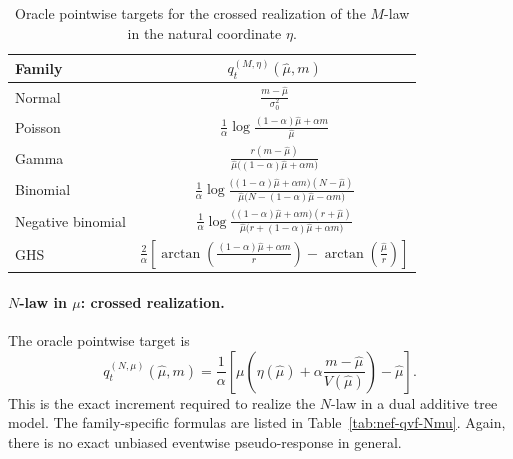 \documentclass[11pt]{article}
\begin{document}
\begin{table}[t]
\centering
\renewcommand{\arraystretch}{1.3}
\setlength{\tabcolsep}{4.5pt}
\begin{tabular}{lc}
\hline
Family & \(q_t^{(M,\eta)}(\hat\mu,m)\) \\
\hline
Normal
&
\(\displaystyle \frac{m-\hat\mu}{\sigma_0^2}\)
\\[1.2ex]

Poisson
&
\(\displaystyle \frac{1}{\alpha}\log\frac{(1-\alpha)\hat\mu+\alpha m}{\hat\mu}\)
\\[1.2ex]

Gamma
&
\(\displaystyle \frac{r(m-\hat\mu)}{\hat\mu\big((1-\alpha)\hat\mu+\alpha m\big)}\)
\\[1.2ex]

Binomial
&
\(\displaystyle
\frac{1}{\alpha}
\log
\frac{\big((1-\alpha)\hat\mu+\alpha m\big)(N-\hat\mu)}
{\hat\mu\big(N-(1-\alpha)\hat\mu-\alpha m\big)}
\)
\\[2.0ex]

Negative binomial
&
\(\displaystyle
\frac{1}{\alpha}
\log
\frac{\big((1-\alpha)\hat\mu+\alpha m\big)(r+\hat\mu)}
{\hat\mu\big(r+(1-\alpha)\hat\mu+\alpha m\big)}
\)
\\[2.0ex]

GHS
&
\(\displaystyle
\frac{2}{\alpha}
\left[
\arctan\!\left(\frac{(1-\alpha)\hat\mu+\alpha m}{r}\right)
-
\arctan\!\left(\frac{\hat\mu}{r}\right)
\right]
\)
\\[2.0ex]
\hline
\end{tabular}
\caption{Oracle pointwise targets for the crossed realization of the \(M\)-law in the natural coordinate \(\eta\).}
\label{tab:nef-qvf-Meta}
\end{table}

\paragraph{\(N\)-law in \(\mu\): crossed realization.}
The oracle pointwise target is
\[
q_t^{(N,\mu)}(\hat\mu,m)
=
\frac{1}{\alpha}
\left[
\mu\!\left(\eta(\hat\mu)+\alpha\frac{m-\hat\mu}{V(\hat\mu)}\right)-\hat\mu
\right].
\]
This is the exact increment required to realize the \(N\)-law in a dual additive tree model. The family-specific formulas are listed in Table~\ref{tab:nef-qvf-Nmu}. Again, there is no exact unbiased eventwise pseudo-response in general.
\end{document}

